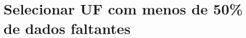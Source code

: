 \begin{comment}
Abordagem paramétrica ou não paramétrica?


[porque idade do pai é faltante com mecanismo MAR?-esperada]

[Quais variáveis estão associadas a variável de interesse?]

[qual modelo de imputação é o mais adequado para a característica do conjunto de dados?]


\textbf{What should you preregister?}
\begin{itemize}
    \item Theory about why your data are missing at random/completely at random/not at random
    \item The method you plan to use to identify missingness (see Step 2)
    \item The auxiliary variables you will test
    \item The effect size or decision rule you plan to apply to determine whether a
    variable should be included as an auxiliary variable in multiple imputation
    or FIML
    \item The multiple imputation model you have chosen (with the predictor matrix
    - both key predictors and auxiliary variables - where appropriate)
    \item An explanation of how the multiple imputation model is congruent with the
    analysis model
\end{itemize}


\section{Definição do modelo proposto}


    The importance of congeniality
■ The imputation model and the analytic model must match.
■ As a general rule, whatever is included in the analytic model needs
to be included in the imputation model (e.g., interaction terms;
random intercepts, random slopes, and contextual effects in
multilevel models)



Quando É Adequado Usar Imputação (slide 2019 - Pedro Luis do Nascimento Silva e Andrea Diniz da Silva- aula 10) 

• Quando os mecanismos de geração de erros são corretamente
identificados;
• Quando informação auxiliar com bom poder preditivo está
disponível para todas as unidades amostradas, levando a
imputações que são próximas dos valores verdadeiros.
• Quando os padrões de não resposta podem ser estabelecidos
como:
o Missing Completely At Random (MCAR);
o Missing At Random (MAR).
• Pode ser difícil ou impossível imputar quando a não resposta é:
o Not Missing At Random (NMAR).
\end{comment}


\section{Selecionar UF com menos de 50\% de dados faltantes}

